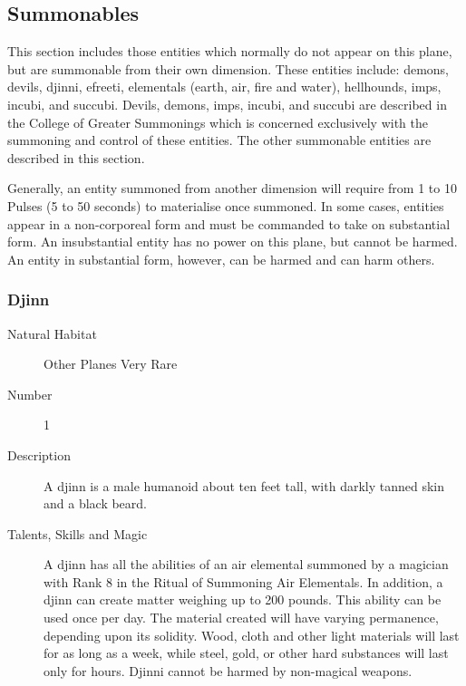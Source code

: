 \begin{multicols}{2}

\setlength\columnseprule{0.2mm}

\section{Summonables}
This section includes those entities which normally do not appear on
this plane, but are summonable from their own dimension.  These
entities include: demons, devils, djinni, efreeti, elementals (earth,
air, fire and water), hellhounds, imps, incubi, and succubi.  Devils,
demons, imps, incubi, and succubi are described in the College of
Greater Summonings which is concerned exclusively with the summoning
and control of these entities.  The other summonable entities are
described in this section.

Generally, an entity summoned from another dimension will require from
1 to 10 Pulses (5 to 50 seconds) to materialise once summoned.  In
some cases, entities appear in a non-corporeal form and must be
commanded to take on substantial form.  An insubstantial entity has no
power on this plane, but cannot be harmed. An entity in substantial
form, however, can be harmed and can harm others.


\subsubsection{Djinn}

\begin{description}
\item[Natural Habitat]  Other Planes Very Rare

\item[Number] 1

\item[Description] A djinn is a male humanoid about ten feet tall, with
darkly tanned skin and a black beard.

\item[Talents, Skills and Magic] A djinn has all the abilities of an air elemental summoned
by a magician with Rank 8 in the Ritual of Summoning Air Elementals.
In addition, a djinn can create matter weighing up to 200 pounds.
This ability can be used once per day.  The material created will have
varying permanence, depending upon its solidity. Wood, cloth and other
light materials will last for as long as a week, while steel, gold, or
other hard substances will last only for hours. Djinni cannot be
harmed by non-magical weapons.


\end{description}
\end{multicols}
